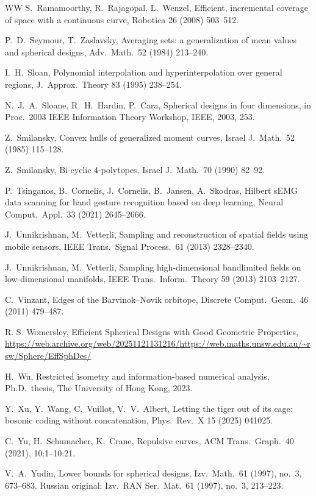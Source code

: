 \documentclass[12pt]{article}
\theoremstyle{plain}
\theoremstyle{definition}
\theoremstyle{remark}
\begin{document}
\begin{thebibliography}{WW}
S.\ Ramamoorthy, R.\ Rajagopal, L.\ Wenzel,
Efficient, incremental coverage of space with a continuous curve,
Robotica 26 (2008) 503--512.

P.\ D.\ Seymour, T.\ Zaslavsky,
Averaging sets: a generalization of mean values and spherical designs,
Adv.\ Math.\ 52 (1984) 213--240.

I.\ H.\ Sloan,
Polynomial interpolation and hyperinterpolation over general regions,
J.\ Approx.\ Theory 83 (1995) 238--254.

N.\ J.\ A.\ Sloane, R.\ H.\ Hardin, P.\ Cara,
Spherical designs in four dimensions,
in Proc.\ 2003 IEEE Information Theory Workshop,
IEEE, 2003, 253.

Z.\ Smilansky,
Convex hulls of generalized moment curves,
Israel J.\ Math.\ 52 (1985) 115--128.

Z.\ Smilansky,
Bi-cyclic 4-polytopes,
Israel J.\ Math.\ 70 (1990) 82--92.

P.\ Tsinganos, B.\ Cornelis, J.\ Cornelis, B.\ Jansen, A.\ Skodras,
Hilbert sEMG data scanning for hand gesture recognition based on deep learning,
Neural Comput.\ Appl.\ 33 (2021) 2645--2666.

J.\ Unnikrishnan, M.\ Vetterli,
Sampling and reconstruction of spatial fields using mobile sensors,
IEEE Trans.\ Signal Process.\ 61 (2013) 2328--2340.

J.\ Unnikrishnan, M.\ Vetterli,
Sampling high-dimensional bandlimited fields on low-dimensional manifolds,
IEEE Trans.\ Inform.\ Theory 59 (2013) 2103--2127.

C.\ Vinzant,
Edges of the Barvinok--Novik orbitope,
Discrete Comput.\ Geom.\ 46 (2011) 479--487.

R. S. Womersley, 
Efficient Spherical Designs with Good Geometric Properties,
\url{https://web.archive.org/web/20251121131216/https://web.maths.unsw.edu.au/~rsw/Sphere/EffSphDes/}

H.\ Wu,
Restricted isometry and information-based numerical analysis,
Ph.D.\ thesis, The University of Hong Kong, 2023.

Y.\ Xu, Y.\ Wang, C.\ Vuillot, V.\ V.\ Albert,
Letting the tiger out of its cage: bosonic coding without concatenation,
Phys.\ Rev.\ X 15 (2025) 041025.

C.\ Yu, H.\ Schumacher, K.\ Crane,
Repulsive curves,
ACM Trans.\ Graph.\ 40 (2021), 10:1--10:21.

V.\ A.\ Yudin,
Lower bounds for spherical designs,
Izv.\ Math.\ 61 (1997), no.\ 3, 673--683.
Russian original: Izv.\ RAN Ser.\ Mat.\ 61 (1997), no.\ 3, 213--223.

\end{thebibliography}
\end{document}
